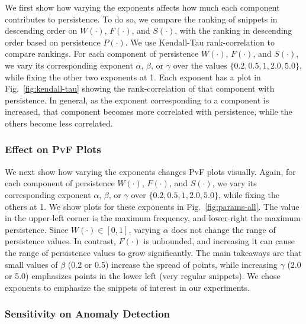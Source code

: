 \documentclass[sigconf]{acmart}
\newcommand{\pf}{\textsc{PvF}\xspace}
\newcommand{\freq}{F}
\newcommand{\width}{W}
\newcommand{\spread}{S}
\newcommand{\persistence}{P}
\newcommand{\wExp}{\alpha}
\newcommand{\fExp}{\beta}
\newcommand{\sExp}{\gamma}
\begin{document}
We first show how varying the exponents affects how much each component contributes to persistence. To do so, we compare the ranking of snippets 
in descending order on $\width(\cdot)$, $\freq(\cdot)$, and $\spread(\cdot)$, with the ranking in descending order based on persistence $\persistence(\cdot)$. We use Kendall-Tau rank-correlation to compare rankings. For each component of persistence $\width(\cdot)$, $\freq(\cdot)$, and $\spread(\cdot)$, we vary its corresponding exponent $\wExp$, $\fExp$, or $\sExp$ over the values $\{0.2, 0.5, 1, 2.0, 5.0\}$, while fixing the other two exponents at 1. Each exponent has a plot in Fig.~\ref{fig:kendall-tau} showing the rank-correlation of that component with persistence. In general, as the exponent corresponding to a component is increased, that component becomes more correlated with persistence, while the others become less correlated.

\subsubsection{Effect on \pf Plots}
\label{subsubsec:visual-parmas}

We next show how varying the exponents changes \pf plots visually. Again, for each component of persistence $\width(\cdot)$, $\freq(\cdot)$, and $\spread(\cdot)$, we vary its corresponding exponent $\wExp$, $\fExp$, or $\sExp$ over $\{0.2, 0.5, 1, 2.0, 5.0\}$, while fixing the others at 1. We show plots for these exponents in Fig.~\ref{fig:params-all}. The value in the upper-left corner is the maximum frequency, and lower-right the maximum persistence. Since $\width(\cdot) \in [0, 1]$, varying $\wExp$ does not change the range of persistence values. In contrast, $\freq(\cdot)$ is unbounded, and increasing it can cause the range of persistence values to grow significantly. The main takeaways are that small values of $\fExp$ (0.2 or 0.5) increase the spread of points, while increasing $\sExp$ (2.0 or 5.0) emphasizes points in the lower left (very regular snippets). We chose exponents to emphasize the snippets of interest in our experiments.



\subsubsection{Sensitivity on Anomaly Detection}
\end{document}
